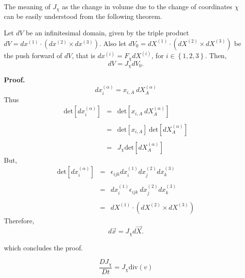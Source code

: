 The meaning of $J_{\chi}$  as the change in volume due to the change of coordinates $\chi$ can be easily understood from the following theorem.

\begin{theo}
\begin{em}
Let $dV$ be an infinitesimal domain, given by the triple product $dV = dx^{(1)} \cdot ( dx^{(2)} \times dx^{(3)})$. Also let $dV_{0} = dX^{(1)} \cdot ( dX^{(2)} \times dX^{(3)})$ be the push forward of $dV$, that is $dx^{(i)} = F_{\chi}dX^{(i)}$, for $i\in\left\{1,2,3\right\}$. Then, $$ dV = J_{\chi}dV_{0}.$$
\end{em}
\end{theo}


\textbf{Proof.} $$ dx_{i}^{(\alpha)} = x_{i,A}\ dX_{A}^{(\alpha)} $$
Thus \begin{eqnarray*} \mbox{det}[dx_{i}^{(\alpha)}] &=& \mbox{det}[x_{i,A}\ dX_{A}^{(\alpha)}]\\ \\
&=& \mbox{det}[x_{i,A}]\  \mbox{det}[dX_{A}^{(\alpha)}]\\ \\
&=& J_{\chi} \mbox{det}[dX_{A}^{(\alpha)}]
\end{eqnarray*}
But,
\begin{eqnarray*} \mbox{det}[dx_{i}^{(\alpha)}] &=& \epsilon_{ijk}dx_{i}^{(1)}dx_{j}^{(2)}dx_{k}^{(3)}\\ \\
&=& dx_{i}^{(1)}\epsilon_{ijk} \ dx_{j}^{(2)}dx_{k}^{(3)}\\ \\
&=& dX^{(1)} \cdot ( dX^{(2)} \times dX^{(3)})
\end{eqnarray*}
Therefore,
$$ d\stackrel{\rightarrow}{x} = J_{\chi}d\stackrel{\rightarrow}{X}.$$

which concludes the proof.


\begin{theo}
$$ \frac{DJ_{\chi}}{Dt} = J_{\chi}\mbox{div}(v)$$
\end{theo}

